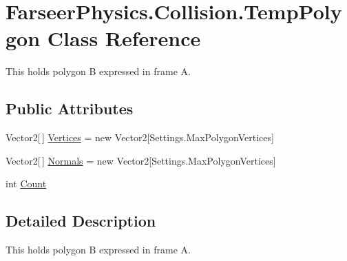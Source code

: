 \hypertarget{class_farseer_physics_1_1_collision_1_1_temp_polygon}{\section{Farseer\+Physics.\+Collision.\+Temp\+Polygon Class Reference}
\label{class_farseer_physics_1_1_collision_1_1_temp_polygon}
}


This holds polygon B expressed in frame A.  


\subsection*{Public Attributes}
\begin{DoxyCompactItemize}
\item 
Vector2\mbox{[}$\,$\mbox{]} \hyperlink{class_farseer_physics_1_1_collision_1_1_temp_polygon_a437767a6ead66438150cb6a5b44e8ccb}{Vertices} = new Vector2\mbox{[}Settings.\+Max\+Polygon\+Vertices\mbox{]}
\item 
Vector2\mbox{[}$\,$\mbox{]} \hyperlink{class_farseer_physics_1_1_collision_1_1_temp_polygon_a45b8cf3f2f8b071e07155c5c74d8dd04}{Normals} = new Vector2\mbox{[}Settings.\+Max\+Polygon\+Vertices\mbox{]}
\item 
int \hyperlink{class_farseer_physics_1_1_collision_1_1_temp_polygon_a3b26651a667fabcf245ff6d36cab85f2}{Count}
\end{DoxyCompactItemize}


\subsection{Detailed Description}
This holds polygon B expressed in frame A. 



